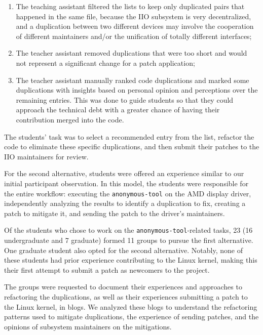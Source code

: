 \documentclass[10pt,conference]{IEEEtran}
\begin{document}
\begin{enumerate}
    \item The teaching assistant filtered the lists to keep only duplicated pairs that happened in the same file, because the IIO subsystem is very decentralized, and a duplication between two different devices may involve the cooperation of different maintainers and/or the unification of totally different interfaces;
    \item The teacher assistant removed duplications that were too short and would not represent a significant change for a patch application;
    \item The teacher assistant manually ranked code duplications and marked some duplications with insights based on personal opinion and perceptions over the remaining entries. This was done to guide students so that they could approach the technical debt with a greater chance of having their contribution merged into the code.
\end{enumerate}

The students' task was to select a recommended entry from the list, refactor the code to eliminate these specific duplications, and then submit their patches to the IIO maintainers for review.

For the second alternative, students were offered an experience similar to our initial participant 
observation. In this model, the students were responsible for the entire workflow: executing the 
\texttt{anonymous-tool} on the AMD display driver, independently analyzing the results to identify a duplication 
to fix, creating a patch to mitigate it, and sending the patch to the driver's maintainers.

Of the students who chose to work on the \texttt{anonymous-tool}-related tasks, 23 (16 undergraduate and 7 graduate) 
formed 11 groups to pursue the first alternative. One graduate student also opted for the second alternative. Notably, none of these students had prior experience contributing to the Linux kernel, making this their first attempt to submit a patch as newcomers to the project.

The groups were requested to document their experiences and approaches to refactoring the duplications, as well as their experiences submitting a patch to the Linux kernel, in blogs. We analyzed these blogs to understand the refactoring patterns used to mitigate duplications, the experience of sending patches, and the opinions of subsystem maintainers on the mitigations.
\end{document}
